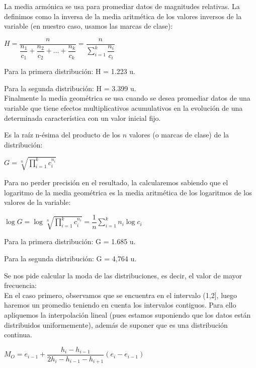 La media armónica se usa para promediar datos de magnitudes relativas. La definimos como la inversa de la media aritmética de los valores inversos de la variable (en nuestro caso, usamos las marcas de clase):
\begin{center}
	$H = \dfrac{n}{\dfrac{n_1}{c_1}+\dfrac{n_2}{c_2}+ ...+\dfrac{n_k}{c_k}} = \dfrac{n}{\sum_{i=1}^{k}\dfrac{n_i}{c_i}}$
\end{center}

Para la primera distribución: H = 1.223 u.

Para la segunda distribución: H = 3.399 u.  \\


Finalmente la media geométrica se usa cuando se desea promediar datos de una variable que tiene efectos
multiplicativos acumulativos en la evolución de una determinada característica con un
valor inicial fijo.

Es la raíz n-ésima del producto de los $n$ valores (o marcas de clase) de la distribución:

\begin{center}
	$G = \sqrt[n]{\prod_{i=1}^{k}c_i^{n_i}}$
\end{center}

Para no perder precisión en el resultado, la calcularemos sabiendo que el logaritmo de la media geométrica es la media aritmética de los logaritmos de los valores de la variable:

\begin{center}
	$\log G = \log \sqrt[n]{\prod_{i=1}^{k}c_i^{n_i}} = \dfrac{1}{n}\sum_{i=1}^{k}n_i \log c_i$
\end{center}

Para la primera distribución: G = 1.685 u.

Para la segunda distribución: G = 4,764 u.  \\


\subproblem

Se nos pide calcular la moda de las distribuciones, es decir, el valor  de mayor frecuencia: \\

En el caso primero, observamos que se encuentra en el intervalo (1,2], luego haremos un promedio teniendo en cuenta los intervalos contiguos. Para ello apliquemos la interpolación lineal (pues estamos suponiendo que los datos están distribuidos uniformemente), además de suponer que es una distribución continua.

\begin{center}
	$M_O = e_{i-1} + \dfrac{h_i - h_{i-1}}{2h_i - h_{i-1} - h_{i+1}} (e_i - e_{i-1})$
\end{center}

